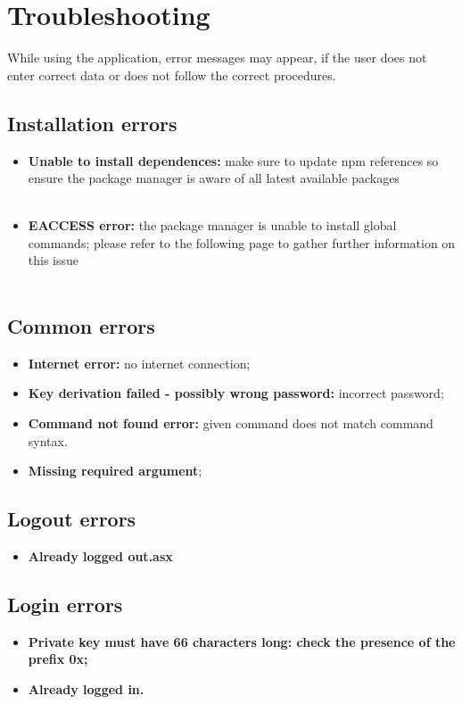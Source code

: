 \section{Troubleshooting}
While using the application, error messages may appear, if the user does not enter correct data or does not follow the correct procedures.
\subsection{Installation errors}
\begin{itemize}
	\item \textbf{Unable to install dependences:} make sure to update npm references so ensure the package manager is aware of all latest available packages\\\\ \centerline{}
	\item \textbf{EACCESS error:} the package manager is unable to install global commands; please refer to the following page to gather further information on this issue\\\\\centerline{}
\end{itemize}
\subsection{Common errors}
\begin{itemize}
	\item \textbf{Internet error:} no internet connection;
	\item \textbf{Key derivation failed - possibly wrong password:} incorrect password;
	\item \textbf{Command not found error:} given command does not match command syntax.
	\item \textbf{Missing required argument};
\end{itemize}
\subsection{Logout errors}
\begin{itemize}
	\item \textbf{Already logged out.asx}
\end{itemize}
\subsection{Login errors}
\begin{itemize}
	\item \textbf{Private key must have 66 characters long: check the presence of the prefix 0x;}
	\item \textbf{Already logged in.}
\end{itemize}
